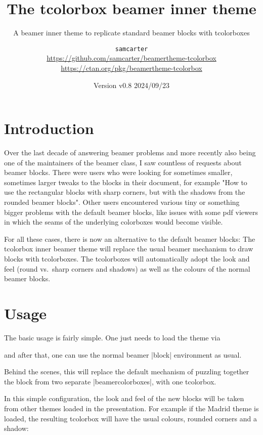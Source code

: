 \documentclass{scrartcl}
\title{The tcolorbox beamer inner theme}
\subtitle{A beamer inner theme to replicate standard beamer blocks with tcolorboxes}
\author{%
  \texorpdfstring{
    \texttt{samcarter}\\
    \url{https://github.com/samcarter/beamertheme-tcolorbox}\\
    \url{https://ctan.org/pkg/beamertheme-tcolorbox}
  }{samcarter}}
\date{Version v0.8 \textendash{} 2024/09/23}
\begin{document}
\maketitle

\section{Introduction}
\label{intro}

Over the last decade of answering beamer problems and more recently also being one of the maintainers of the beamer class, I saw countless of requests about beamer blocks. There were users who were looking for sometimes smaller, sometimes larger tweaks to the blocks in their document, for example "How to use the rectangular blocks with sharp corners, but with the shadows from the rounded beamer blocks". Other users encountered various tiny or something bigger problems with the default beamer blocks, like issues with some pdf viewers in which the seams of the underlying colorboxes would become visible.

For all these cases, there is now an alternative to the default beamer blocks: The tcolorbox inner beamer theme will replace the usual beamer mechanism to draw blocks with tcolorboxes. The tcolorboxes will automatically adopt the look and feel (round vs.\ sharp corners and shadows) as well as the colours of the normal beamer blocks.

\blurb

\section{Usage}

The basic usage is fairly simple. One just needs to load the theme via
\begin{tcolorbox}[lower separated=false,title={Usage}]
\begin{samcode}
\end{samcode}
\end{tcolorbox}
and after that, one can use the normal beamer \saminline|block| environment as usual.

Behind the scenes, this will replace the default mechanism of puzzling together the block from two separate \saminline|beamercolorboxes|, with one tcolorbox.

In this simple configuration, the look and feel of the new blocks will be taken from other themes loaded in the presentation. For example if the Madrid theme is loaded, the resulting tcolorbox will have the usual colours, rounded corners and a shadow:
\end{document}
